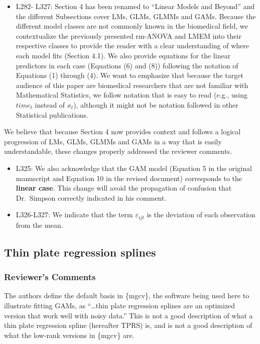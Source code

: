 \documentclass[
]{article}
\providecommand{\tightlist}{%
  \setlength{\itemsep}{0pt}\setlength{\parskip}{0pt}}
\begin{document}
\begin{itemize}
\tightlist
\item
  L282- L327: Section 4 has been renamed to ``Linear Models and Beyond'' and the different Subsections cover LMs, GLMs, GLMMs and GAMs. Because the different model classes are not commonly known in the biomedical field, we contextualize the previously presented rm-ANOVA and LMEM into their respective classes to provide the reader with a clear understanding of where each model fits (Section 4.1). We also provide equations for the linear predictors in each case (Equations (6) and (8)) following the notation of Equations (1) through (4). We want to emphasize that because the target audience of this paper are biomedical researchers that are not familiar with Mathematical Statistics, we follow notation that is easy to read (e.g., using \(time_t\) instead of \(x_t\)), although it might not be notation followed in other Statistical publications.
\end{itemize}

We believe that because Section 4 now provides context and follows a logical progression of LMs, GLMs, GLMMs and GAMs in a way that is easily understandable, these changes properly addressed the reviewer comments.

\begin{itemize}
\item
  L325: We also acknowledge that the GAM model (Equation 5 in the original manuscript and Equation 10 in the revised document) corresponds to the \textbf{linear case}. This change will avoid the propagation of confusion that Dr.~Simpson correctly indicated in his comment.
\item
  L326-L327: We indicate that the term \(\varepsilon_{ijt}\) is the deviation of each observation from the mean.
\end{itemize}

\hypertarget{thin-plate-regression-splines}{%
\subsection{Thin plate regression splines}\label{thin-plate-regression-splines}}

\hypertarget{reviewers-comments-3}{%
\subsubsection{Reviewer's Comments}\label{reviewers-comments-3}}

The authors define the default basis in \{mgcv\}, the software being used here to illustrate fitting GAMs, as ``\ldots thin plate regression splines are an optimized version that work well with noisy data.'' This is not a good description of what a thin plate regression spline (hereafter TPRS) is, and is not a good description of what the low-rank versions in \{mgcv\} are.
\end{document}
